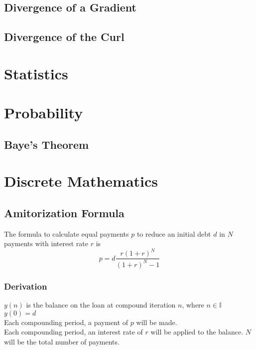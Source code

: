 \documentclass[11pt]{book}
\begin{document}
\section{Divergence of a Gradient}
\section{Divergence of the Curl}

\chapter{Statistics}

\chapter{Probability}
\section{Baye's Theorem}

\chapter{Discrete Mathematics}

\section{Amitorization Formula}
The formula to calculate equal payments \(p\) to reduce an initial debt \(d\) in \(N\) payments with interest rate \(r\) is\\

\[p = d\frac{r(1+r)^N}{(1+r)^N -1}\]

\subsection{Derivation}
\(y(n)\) is the balance on the loan at compound iteration \(n\), where \(n \in \mathbb{I} \)\\
\(y(0) = d\) \\
Each compounding period, a payment of \(p\) will be made.\\
Each compounding period, an interest rate of \(r\) will be applied to the balance.
\(N\) will be the total number of payments.\\
\end{document}
